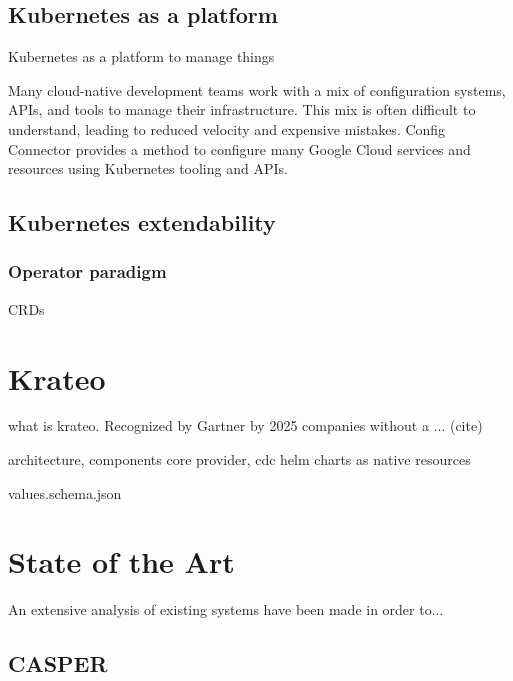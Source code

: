 \subsection{Kubernetes as a platform}
Kubernetes as a platform to manage things


Many cloud-native development teams work with a mix of configuration systems, APIs, and tools to manage their infrastructure. This mix is often difficult to understand, leading to reduced velocity and expensive mistakes. Config Connector provides a method to configure many Google Cloud services and resources using Kubernetes tooling and APIs.


\subsection{Kubernetes extendability}

\subsubsection{Operator paradigm}

CRDs


\section{Krateo}
\label{sec:krateo}

what is krateo. Recognized by Gartner
by 2025 companies without a ... (cite)

architecture, components
core provider, cdc
helm charts as native resources

values.schema.json



\section{State of the Art}
An extensive analysis of existing systems have been made in order to...

\subsection{CASPER}

